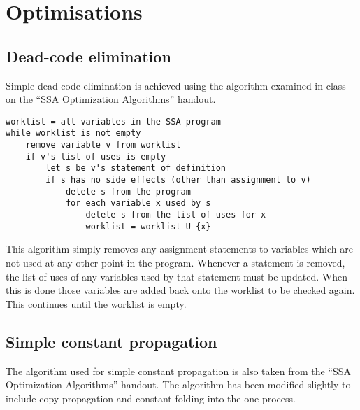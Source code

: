 \documentclass[a4paper,10pt]{report}
\begin{document}
\section{Optimisations}

\subsection{Dead-code elimination}
Simple dead-code elimination is achieved using the algorithm examined in class on the ``SSA Optimization Algorithms'' handout.

\begin{verbatim}
worklist = all variables in the SSA program
while worklist is not empty
    remove variable v from worklist
    if v's list of uses is empty
        let s be v's statement of definition
        if s has no side effects (other than assignment to v)
            delete s from the program
            for each variable x used by s
                delete s from the list of uses for x
                worklist = worklist U {x}
\end{verbatim}
This algorithm simply removes any assignment statements to variables which are not used at any other point in the program.
Whenever a statement is removed, the list of uses of any variables used by that statement must be updated. When this is done
those variables are added back onto the worklist to be checked again. This continues until the worklist is empty.

\subsection{Simple constant propagation}
The algorithm used for simple constant propagation is also taken from the ``SSA Optimization Algorithms'' handout.
The algorithm has been modified slightly to include copy propagation and constant folding into the one process.
\end{document}
